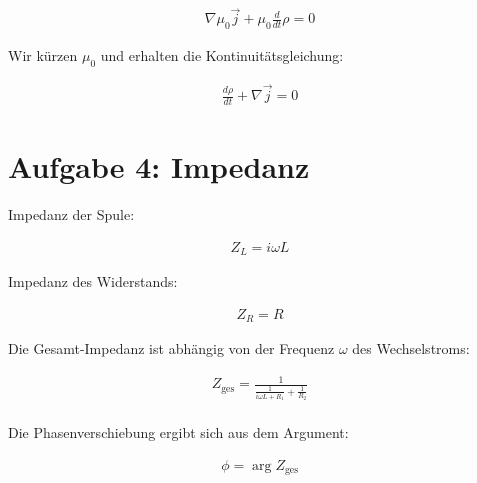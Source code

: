 \documentclass[a4paper,german,12pt,smallheadings]{scrartcl}
\begin{document}
\begin{align*}
  \nabla \mu_0 \vec{j} + \mu_0 \frac{d}{dt} \rho = 0
\end{align*}

Wir kürzen $\mu_0$ und erhalten die Kontinuitätsgleichung:

\begin{align*}
  \frac{d \rho}{d t} + \nabla \vec{j} = 0
\end{align*}

\section*{Aufgabe 4: Impedanz}

Impedanz der Spule:

\begin{align*}
  Z_{L} = i \omega L
\end{align*}

Impedanz des Widerstands:

\begin{align*}
  Z_{R} = R
\end{align*}

Die Gesamt-Impedanz ist abhängig von der Frequenz $\omega$ des Wechselstroms:

\begin{align*}
  Z_{\text{ges}}  =\frac{1}{\frac{1}{i \omega L + R_1} + \frac{1}{R_2}} \\
\end{align*}

Die Phasenverschiebung ergibt sich aus dem Argument:

\begin{align*}
  \phi = \arg Z_{\text{ges}}
\end{align*}
\end{document}
